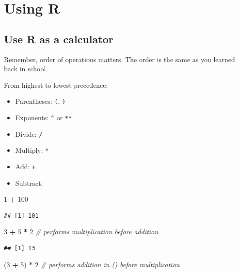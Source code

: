 \documentclass[
]{book}
\newenvironment{Shaded}{\begin{snugshade}}{\end{snugshade}}
\newcommand{\CommentTok}[1]{\textcolor[rgb]{0.56,0.35,0.01}{\textit{#1}}}
\newcommand{\DecValTok}[1]{\textcolor[rgb]{0.00,0.00,0.81}{#1}}
\newcommand{\NormalTok}[1]{#1}
\newcommand{\SpecialCharTok}[1]{\textcolor[rgb]{0.81,0.36,0.00}{\textbf{#1}}}
\providecommand{\tightlist}{%
  \setlength{\itemsep}{0pt}\setlength{\parskip}{0pt}}
\begin{document}
\chapter{Using R}\label{using-r}

\section{Use R as a calculator}\label{use-r-as-a-calculator}

Remember, order of operations matters. The order is the same as you learned back in school.

From highest to lowest precedence:

\begin{itemize}
\tightlist
\item
  Parentheses: \texttt{(}, \texttt{)}
\item
  Exponents: \texttt{\^{}} or \texttt{**}
\item
  Divide: \texttt{/}
\item
  Multiply: \texttt{*}
\item
  Add: \texttt{+}
\item
  Subtract: \texttt{-}
\end{itemize}

\begin{Shaded}
\begin{Highlighting}[]
\DecValTok{1} \SpecialCharTok{+} \DecValTok{100}
\end{Highlighting}
\end{Shaded}

\begin{verbatim}
## [1] 101
\end{verbatim}

\begin{Shaded}
\begin{Highlighting}[]
\DecValTok{3} \SpecialCharTok{+} \DecValTok{5} \SpecialCharTok{*} \DecValTok{2} \CommentTok{\# performs multiplication before addition}
\end{Highlighting}
\end{Shaded}

\begin{verbatim}
## [1] 13
\end{verbatim}

\begin{Shaded}
\begin{Highlighting}[]
\NormalTok{(}\DecValTok{3} \SpecialCharTok{+} \DecValTok{5}\NormalTok{) }\SpecialCharTok{*} \DecValTok{2} \CommentTok{\# performs addition in () before multiplication }
\end{Highlighting}
\end{Shaded}
\end{document}
